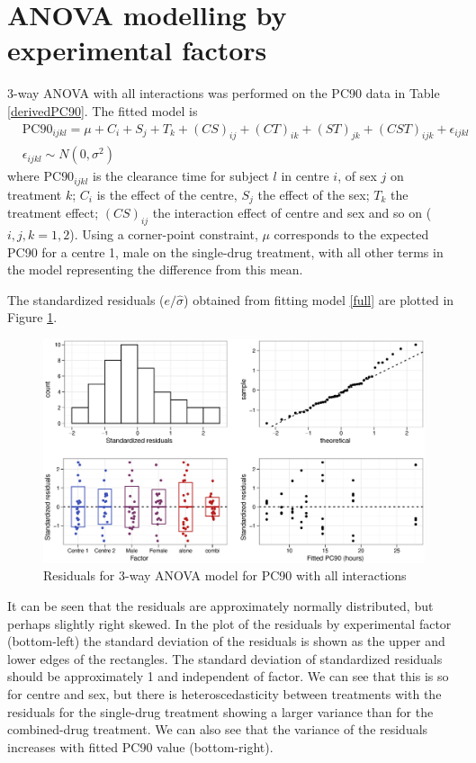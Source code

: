 \section{ANOVA modelling by experimental factors}
3-way ANOVA with all interactions was performed on the PC90 data in Table \ref{derivedPC90}. The fitted model is
\begin{eqnarray}
&\mathrm{PC}90_{ijkl}=\mu+C_i+S_j+T_k+(CS)_{ij}+(CT)_{ik}+(ST)_{jk}+(CST)_{ijk}+\epsilon_{ijkl}&\nonumber\\
&\epsilon_{ijkl}\sim N(0,\sigma^2)&\label{full}
\end{eqnarray}
where PC$90_{ijkl}$ is the clearance time for subject $l$ in centre $i$, of sex $j$ on treatment $k$; $C_i$ is the effect of the centre, $S_j$ the effect of the sex; $T_k$ the treatment effect; $(CS)_{ij}$ the interaction effect of centre and sex and so on ($i,j,k=1,2$). Using a corner-point constraint, $\mu$ corresponds to the expected PC90 for a centre 1, male on the single-drug treatment, with all other terms in the model representing the difference from this mean.

The standardized residuals ($e/\hat{\sigma}$) obtained from fitting model \ref{full} are plotted in Figure \ref{aovloglinres}.
\begin{figure}[ht]
\includegraphics[width=150mm]{aovloglinres.eps} 
\caption{Residuals for 3-way ANOVA model for PC90 with all interactions}
\label{aovloglinres}
\end{figure}

It can be seen that the residuals are approximately normally distributed, but perhaps slightly right skewed. In the plot of the residuals by experimental factor (bottom-left) the standard deviation of the residuals is shown as the upper and lower edges of the rectangles. The standard deviation of standardized residuals should be approximately 1 and independent of factor. We can see that this is so for centre and sex, but there is heteroscedasticity between treatments with the residuals for the single-drug treatment showing a larger variance than for the combined-drug treatment.
We can also see that the variance of the residuals increases with fitted PC90 value (bottom-right).

